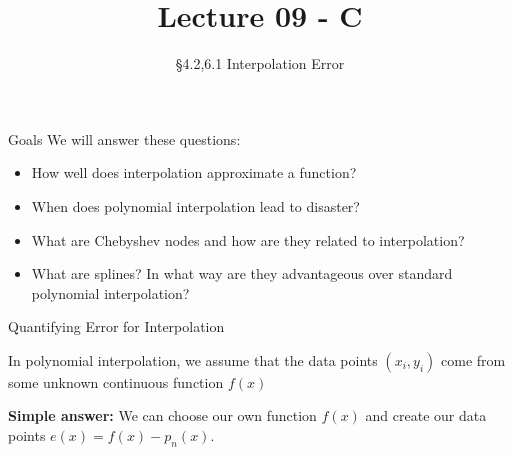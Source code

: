 \documentclass[10pt]{beamer}
\title[Math/CS 375]{Lecture 09 - C}
\subtitle{\S 4.2,6.1 Interpolation Error}
\begin{document}
\begin{frame}
  \titlepage
\end{frame}
\begin{frame}{Goals}
We will answer these questions:\\[3mm]
\begin{itemize}
    \item How well does interpolation approximate a function?
    \item When does polynomial interpolation lead to disaster? 
    \item What are Chebyshev nodes and how are they related to interpolation?
    \item What are splines? In what way are they advantageous over standard polynomial interpolation?
\end{itemize}
\end{frame}


\begin{frame}{Quantifying Error for Interpolation}

{}

\begin{block}{}
    In polynomial interpolation, we assume that the data points $(x_i,y_i)$ come from some unknown continuous function $f(x)$
\end{block}

\begin{block}{}
    \textbf{Simple answer:} We can choose our own function $f(x)$ and create our data points  $e(x)=f(x)-p_n(x)$. 
\end{block}
\end{frame}

\end{document}
